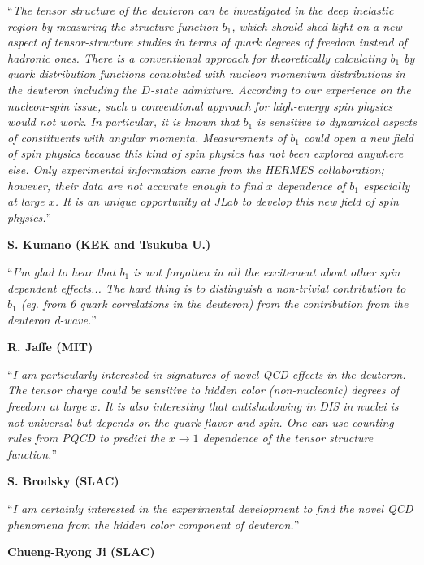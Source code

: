 \vspace{0.5cm}
``{\it The tensor structure of the deuteron can be investigated in the deep
inelastic region by measuring the structure function $b_1$, which
should shed light on a new aspect of tensor-structure studies in
terms of quark degrees of freedom instead of hadronic ones.
There is a conventional approach for theoretically calculating $b_1$
by quark distribution functions convoluted with nucleon momentum
distributions in the deuteron including the $D$-state admixture.
According to our experience on the nucleon-spin issue, such
a conventional approach for high-energy spin physics would not work.
In particular, it is known that $b_1$ is sensitive to dynamical aspects
of constituents with angular momenta. Measurements of $b_1$ could open
a new field of spin physics because this kind of spin physics has not
been explored anywhere else. Only experimental information came from
the HERMES collaboration; however, their data are not accurate enough
to find $x$ dependence of $b_1$ especially at large $x$. It is
an unique opportunity at JLab to develop this new field of spin physics.}''
\begin{flushright}{\bf S. Kumano (KEK and Tsukuba U.)}\end{flushright}

\vspace{0.5cm}
``{\it I'm glad to hear that $b_1$ is not forgotten in all the excitement about other spin dependent 
effects...
The hard thing is to distinguish a non-trivial contribution to $b_1$ (eg. 
from 6 quark correlations in the deuteron) from the contribution from the deuteron d-wave.}''
\begin{flushright}{\bf R. Jaffe (MIT)}\end{flushright}

\vspace{0.5cm}
``{\it I am particularly interested in signatures of novel QCD effects in the deuteron. The tensor 
charge could be sensitive to hidden color (non-nucleonic) degrees of freedom at large $x$. It is
also interesting that antishadowing in DIS in nuclei is not universal but depends on the quark 
flavor and spin. One can use counting rules from PQCD to predict the $x \to 1$ dependence of the 
tensor structure function.}''
\begin{flushright}{\bf S. Brodsky (SLAC)}\end{flushright}
 
\vspace{0.5cm}
``{\it I am certainly interested in the experimental development to find the novel
QCD phenomena from the hidden color component of deuteron.}''
\begin{flushright}{\bf Chueng-Ryong Ji (SLAC)}\end{flushright}

